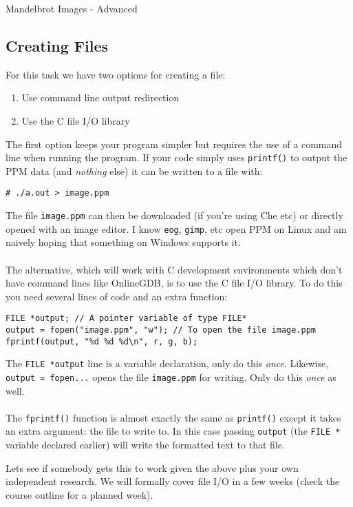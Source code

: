 \documentclass{lab}
\begin{document}
\begin{task}{Mandelbrot Images - Advanced}{}
\subsection*{Creating Files}
For this task we have two options for creating a file:
\begin{enumerate}
\item Use command line output redirection
\item Use the C file I/O library
\end{enumerate}
The first option keeps your program simpler but requires the use of a command line when running the program. If your code simply uses \texttt{printf()} to output the PPM data (and \textit{nothing} else) it can be written to a file with:
\begin{lstlisting}[style=pseudo]
# ./a.out > image.ppm
\end{lstlisting}
The file \texttt{image.ppm} can then be downloaded (if you're using Che etc) or directly opened with an image editor. I know \texttt{eog}, \texttt{gimp}, etc open PPM on Linux and am naively hoping that something on Windows supports it.
\\~\\
The alternative, which will work with C development environments which don't have command lines like OnlineGDB, is to use the C file I/O library. To do this you need several lines of code and an extra function:
\begin{lstlisting}[style=CStyle]
FILE *output; // A pointer variable of type FILE*
output = fopen("image.ppm", "w"); // To open the file image.ppm
fprintf(output, "%d %d %d\n", r, g, b);
\end{lstlisting}
The \texttt{FILE *output} line is a variable declaration, only do this \textit{once}. Likewise, \texttt{output = fopen...} opens the file \texttt{image.ppm} for writing. Only do this \textit{once} as well.
\\~\\
The \texttt{fprintf()} function is almost exactly the same as \texttt{printf()} except it takes an extra argument: the file to write to. In this case passing \texttt{output} (the \texttt{FILE *} variable declared earlier) will write the formatted text to that file.

Lets see if somebody gets this to work given the above plus your own independent research. We will formally cover file I/O in a few weeks (check the course outline for a planned week).
\end{task}

\pagebreak 
\end{document}
